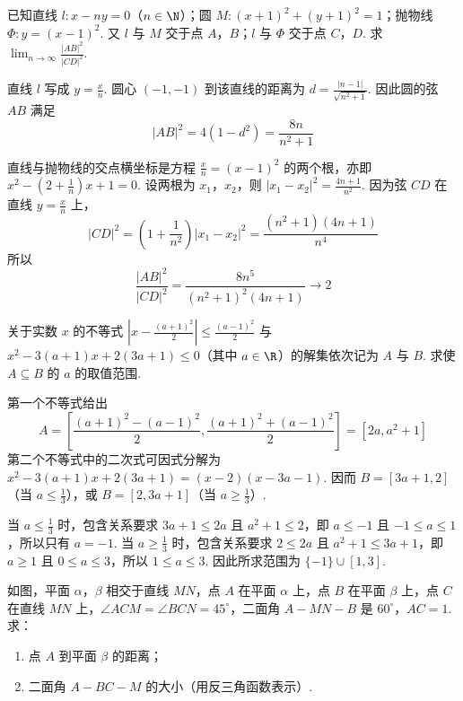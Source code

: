 \begin{problem}
已知直线 \(l:x-ny=0\)（\(n\in\N\)）；圆 \(M:(x+1)^2+(y+1)^2=1\)；抛物线 \(\Phi:y=(x-1)^2\). 又 \(l\) 与 \(M\) 交于点 \(A\)，\(B\)；\(l\) 与 \(\Phi\) 交于点 \(C\)，\(D\). 求 \(\displaystyle\lim_{n\to\infty}\frac{\left|AB\right|^2}{\left|CD\right|^2}\).
\end{problem}

\begin{solution}
直线 \(l\) 写成 \(y=\frac{x}{n}\). 圆心 \((-1,-1)\) 到该直线的距离为
\(d=\frac{|n-1|}{\sqrt{n^2+1}}\). 因此圆的弦 \(AB\) 满足
\[
\left|AB\right|^2=4(1-d^2)=\frac{8n}{n^2+1}
\]

直线与抛物线的交点横坐标是方程 \(\frac{x}{n}=(x-1)^2\) 的两个根，亦即
\(x^2-\left(2+\frac1n\right)x+1=0\). 设两根为 \(x_1\)，\(x_2\)，则
\(\left|x_1-x_2\right|^2=\frac{4n+1}{n^2}\). 因为弦 \(CD\) 在直线 \(y=\frac{x}{n}\) 上，
\[
\left|CD\right|^2=\left(1+\frac1{n^2}\right)\left|x_1-x_2\right|^2=\frac{(n^2+1)(4n+1)}{n^4}
\]
所以
\[
\frac{\left|AB\right|^2}{\left|CD\right|^2}=\frac{8n^5}{(n^2+1)^2(4n+1)}\longrightarrow2
\]
\end{solution}

\begin{problem}
关于实数 \(x\) 的不等式 \(\left|x-\frac{(a+1)^2}{2}\right|\le\frac{(a-1)^2}{2}\) 与 \(x^2-3(a+1)x+2(3a+1)\le0\)（其中 \(a\in\R\)）的解集依次记为 \(A\) 与 \(B\). 求使 \(A\subseteq B\) 的 \(a\) 的取值范围.
\end{problem}

\begin{solution}
第一个不等式给出
\[
A=\left[\frac{(a+1)^2-(a-1)^2}{2},\frac{(a+1)^2+(a-1)^2}{2}\right]=[2a,a^2+1]
\]
第二个不等式中的二次式可因式分解为
\(x^2-3(a+1)x+2(3a+1)=(x-2)(x-3a-1)\). 因而
\(B=[3a+1,2]\)（当 \(a\le\frac13\)），或 \(B=[2,3a+1]\)（当 \(a\ge\frac13\)）.

当 \(a\le\frac13\) 时，包含关系要求 \(3a+1\le2a\) 且 \(a^2+1\le2\)，即 \(a\le-1\) 且 \(-1\le a\le1\)，所以只有 \(a=-1\). 当 \(a\ge\frac13\) 时，包含关系要求 \(2\le2a\) 且 \(a^2+1\le3a+1\)，即 \(a\ge1\) 且 \(0\le a\le3\)，所以 \(1\le a\le3\). 因此所求范围为 \(\{-1\}\cup[1,3]\).
\end{solution}

\begin{problem}
如图，平面 \(\alpha\)，\(\beta\) 相交于直线 \(MN\)，点 \(A\) 在平面 \(\alpha\) 上，点 \(B\) 在平面 \(\beta\) 上，点 \(C\) 在直线 \(MN\) 上，\(\angle ACM=\angle BCN=45^\circ\)，二面角 \(A-MN-B\) 是 \(60^\circ\)，\(AC=1\). 求：

\begin{enumerate}
\item 点 \(A\) 到平面 \(\beta\) 的距离；
\item 二面角 \(A-BC-M\) 的大小（用反三角函数表示）.
\end{enumerate}

\FloatBarrier
\end{problem}

